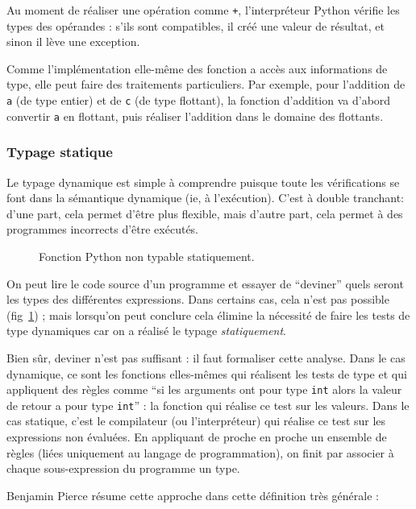 Au moment de réaliser une opération comme \texttt{+}, l'interpréteur Python
vérifie les types des opérandes : s'ils sont compatibles, il créé une valeur de
résultat, et sinon il lève une exception.

Comme l'implémentation elle-même des fonction a accès aux informations de type,
elle peut faire des traitements particuliers. Par exemple, pour l'addition de
\texttt{a} (de type entier) et de \texttt{c} (de type flottant), la fonction
d'addition va d'abord convertir \texttt{a} en flottant, puis réaliser l'addition
dans le domaine des flottants.

\subsubsection{Typage statique}

Le typage dynamique est simple à comprendre puisque toute les vérifications se
font dans la sémantique dynamique (ie, à l'exécution). C'est à double tranchant:
d'une part, cela permet d'être plus flexible, mais d'autre part, cela permet à
des programmes incorrects d'être exécutés.

\begin{figure}
  \caption{Fonction Python non typable statiquement.}
  \label{fig:nontypable}
\end{figure}

On peut lire le code source d'un programme et essayer de ``deviner'' quels
seront les types des différentes expressions. Dans certains cas, cela n'est pas
possible (fig~\ref{fig:nontypable}) ; mais lorsqu'on peut conclure cela élimine
la nécessité de faire les tests de type dynamiques car on a réalisé le typage
\emph{statiquement}.

Bien sûr, deviner n'est pas suffisant : il faut formaliser cette analyse. Dans
le cas dynamique, ce sont les fonctions elles-mêmes qui réalisent les tests de
type et qui appliquent des règles comme ``si les arguments ont pour type
\texttt{int} alors la valeur de retour a pour type \texttt{int}'' : la
fonction qui réalise ce test sur les valeurs. Dans le cas statique,
c'est le compilateur (ou l'interpréteur) qui réalise ce test sur les
expressions non évaluées. En
appliquant de proche en proche un ensemble de règles (liées uniquement au
langage de programmation), on finit par associer à chaque sous-expression du
programme un type.

Benjamin Pierce résume cette approche dans cette définition très générale :

